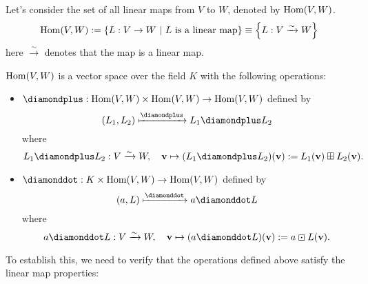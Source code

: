 Let's consider the set of all linear maps from \(V\) to \(W\), denoted by \(\operatorname{Hom}(V, W)\).
\begin{equation}
    \operatorname{Hom}(V, W) := \qty{L: V \to W \ \middle|\ L \text{ is a linear map}} \equiv \qty{L: V \xrightarrow{\sim} W}
\end{equation}
here \(\xrightarrow{\sim}\) denotes that the map is a linear map.
\begin{proposition}
    \(\operatorname{Hom}(V, W)\) is a vector space over the field \(K\) with the following operations:
    \begin{itemize}
        \item \(\diamondplus: \Hom(V, W) \times \Hom(V, W) \to \Hom(V, W)\) defined by
              \begin{equation}
                  (L_1, L_2) \xmapsto{\diamondplus} L_1 \diamondplus L_2
              \end{equation}
              where
              \begin{equation}
                  L_1 \diamondplus L_2: V \xrightarrow{\sim} W, \quad \vb{v} \mapsto (L_1 \diamondplus L_2)(\vb{v}) := L_1(\vb{v}) \boxplus L_2(\vb{v}).
              \end{equation}

        \item \(\diamonddot: K \times \Hom(V, W) \to \Hom(V, W)\) defined by
              \begin{equation}
                  (a, L) \xmapsto{\diamonddot} a \diamonddot L
              \end{equation}
              where
              \begin{equation}
                  a \diamonddot L: V \xrightarrow{\sim} W, \quad \vb{v} \mapsto (a \diamonddot L)(\vb{v}) := a \boxdot L(\vb{v}).
              \end{equation}
    \end{itemize}
\end{proposition}
To establish this, we need to verify that the operations defined above satisfy the linear map properties:
